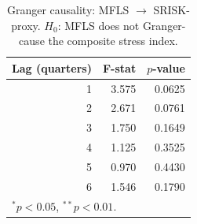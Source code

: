 \begin{table}[h]
\centering
\caption{Granger causality: MFLS $\to$ SRISK-proxy. $H_0$: MFLS does not Granger-cause the composite stress index.}
\label{tab:granger}
\begin{tabular}{rrr}
\toprule
Lag (quarters) & F-stat & $p$-value \\
\midrule
1 & 3.575 & 0.0625 \\
2 & 2.671 & 0.0761 \\
3 & 1.750 & 0.1649 \\
4 & 1.125 & 0.3525 \\
5 & 0.970 & 0.4430 \\
6 & 1.546 & 0.1790 \\
\midrule
\multicolumn{3}{l}{\footnotesize $^{*}p<0.05$, $^{**}p<0.01$.} \\
\bottomrule
\end{tabular}
\end{table}